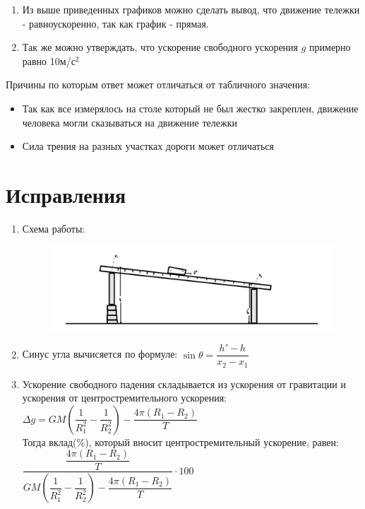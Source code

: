 \documentclass[a4paper]{article}
\begin{document}
\begin{enumerate}
	\item Из выше приведенных графиков можно сделать вывод, что движение тележки - равноускоренно, так как график - прямая.
	\item Так же можно утверждать, что ускорение свободного ускорения $g$ примерно равно 10м/с$^2$
\end{enumerate}

Причины по которым ответ может отличаться от табличного значения:
\begin{itemize}
	\item Так как все измерялось на столе который не был жестко закреплен, движение человека могли сказываться на движение тележки
	\item Сила трения на разных участках дороги может отличаться
\end{itemize}
\section{\textbf{Исправления}}
\begin{enumerate}
	\item Схема работы:
\begin{figure}[H]
\begin{center}
\includegraphics[scale=0.5]{pickpick.png}\\
\end{center}
\end{figure}
\item Синус угла вычисяется по формуле: $\sin{\theta}=\dfrac{h'-h}{x_2-x_1}$
\item Ускорение свободного падения складывается из ускорения от гравитации и ускорения от центростремительного ускорения:\\
	$\Delta g =GM(\dfrac{1}{R_1^2}-\dfrac{1}{R_2^2})-\dfrac{4\pi(R_1-R_2)}{T}$\\
	Тогда вклад(\%), который вносит центростремительный ускорение, равен: $\dfrac{\dfrac{4\pi(R_1-R_2)}{T}}{GM(\dfrac{1}{R_1^2}-\dfrac{1}{R_2^2})-\dfrac{4\pi(R_1-R_2)}{T}}\cdot100$

\end{enumerate}
\end{document}

